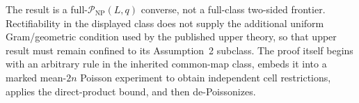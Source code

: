 The result is a full-\(\mathcal P_{\mathrm{NP}}(L,q)\) converse, not a full-class two-sided frontier.  Rectifiability in the displayed class does not supply the additional uniform Gram/geometric condition used by the published upper theory, so that upper result must remain confined to its Assumption~2 subclass.  The proof itself begins with an arbitrary rule in the inherited common-map class, embeds it into a marked mean-\(2n\) Poisson experiment to obtain independent cell restrictions, applies the direct-product bound, and then de-Poissonizes.